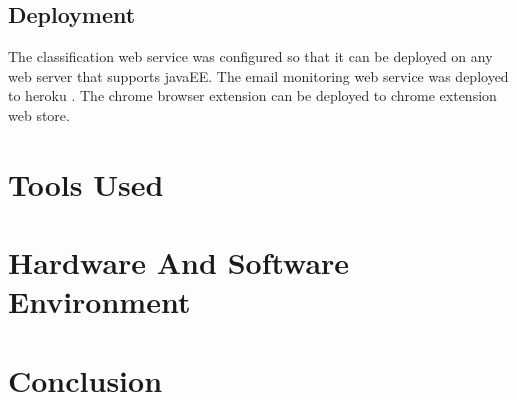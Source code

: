 \subsection{Deployment}
The classification web service was configured so that it can be deployed on any web server that supports javaEE.
The email monitoring web service was deployed to heroku \cite{HEROKU}.
The chrome browser extension can be deployed to chrome extension web store.
\section{Tools Used}

\section{Hardware And Software Environment}

\section{Conclusion}
